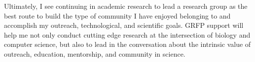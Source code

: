 Ultimately, I see continuing in academic research to lead a research group as the best route to build the type of community I have enjoyed belonging to and accomplish my outreach, technological, and scientific goals.
GRFP support will help me not only conduct cutting edge research at the intersection of biology and computer science, but also to lead in the conversation about the intrinsic value of outreach, education, mentorship, and community in science.
